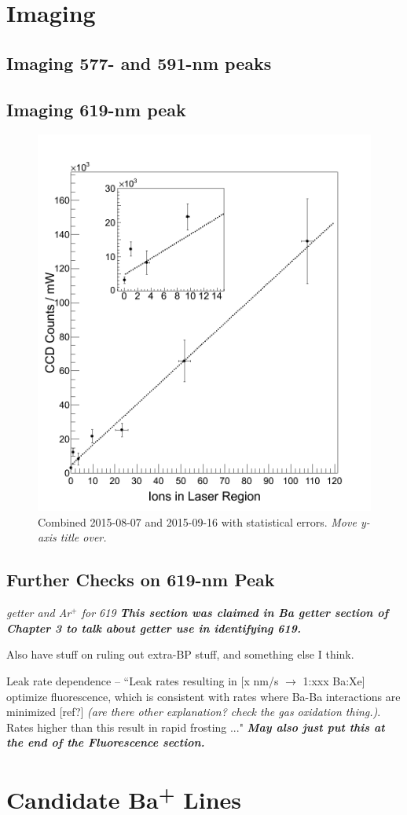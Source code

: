 \section{Imaging}
\label{imaging}

\subsection{Imaging 577- and 591-nm peaks}

\subsection{Imaging 619-nm peak}

\begin{figure} %
        \centering
                \includegraphics[width=.7\textwidth]{figures/fitgrouped_20150807_20150916_inset.png}
                \caption{Combined 2015-08-07 and 2015-09-16 with statistical errors.  \emph{\color{gray}Move y-axis title over.}}
\label{fig:lin}
\end{figure}

\subsection{Further Checks on 619-nm Peak}

\emph{\color{gray}getter and Ar$^{+}$ for 619 \textbf{\color{gray}This section was claimed in Ba getter section of Chapter 3 to talk about getter use in identifying 619.}}

Also have stuff on ruling out extra-BP stuff, and something else I think.

Leak rate dependence -- ``Leak rates resulting in [x nm/s $\rightarrow$ 1:xxx Ba:Xe] optimize fluorescence, which is consistent with rates where Ba-Ba interactions are minimized [ref?] \emph{\color{gray}(are there other explanation?  check the gas oxidation thing.)}.  Rates higher than this result in rapid frosting ..." \emph{\textbf{\color{gray}May also just put this at the end of the  Fluorescence section.}}

\section{Candidate Ba\textsuperscript{+} Lines}
\label{sec:BaPlus}